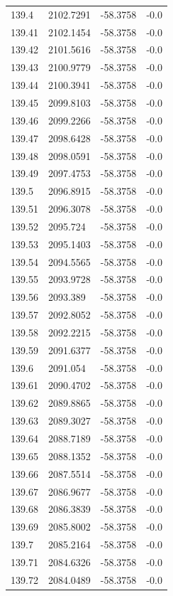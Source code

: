 \begin{table}[H]
\begin{tabular}{llll}
139.4 & 2102.7291 & -58.3758 & -0.0 \\
139.41 & 2102.1454 & -58.3758 & -0.0 \\
139.42 & 2101.5616 & -58.3758 & -0.0 \\
139.43 & 2100.9779 & -58.3758 & -0.0 \\
139.44 & 2100.3941 & -58.3758 & -0.0 \\
139.45 & 2099.8103 & -58.3758 & -0.0 \\
139.46 & 2099.2266 & -58.3758 & -0.0 \\
139.47 & 2098.6428 & -58.3758 & -0.0 \\
139.48 & 2098.0591 & -58.3758 & -0.0 \\
139.49 & 2097.4753 & -58.3758 & -0.0 \\
139.5 & 2096.8915 & -58.3758 & -0.0 \\
139.51 & 2096.3078 & -58.3758 & -0.0 \\
139.52 & 2095.724 & -58.3758 & -0.0 \\
139.53 & 2095.1403 & -58.3758 & -0.0 \\
139.54 & 2094.5565 & -58.3758 & -0.0 \\
139.55 & 2093.9728 & -58.3758 & -0.0 \\
139.56 & 2093.389 & -58.3758 & -0.0 \\
139.57 & 2092.8052 & -58.3758 & -0.0 \\
139.58 & 2092.2215 & -58.3758 & -0.0 \\
139.59 & 2091.6377 & -58.3758 & -0.0 \\
139.6 & 2091.054 & -58.3758 & -0.0 \\
139.61 & 2090.4702 & -58.3758 & -0.0 \\
139.62 & 2089.8865 & -58.3758 & -0.0 \\
139.63 & 2089.3027 & -58.3758 & -0.0 \\
139.64 & 2088.7189 & -58.3758 & -0.0 \\
139.65 & 2088.1352 & -58.3758 & -0.0 \\
139.66 & 2087.5514 & -58.3758 & -0.0 \\
139.67 & 2086.9677 & -58.3758 & -0.0 \\
139.68 & 2086.3839 & -58.3758 & -0.0 \\
139.69 & 2085.8002 & -58.3758 & -0.0 \\
139.7 & 2085.2164 & -58.3758 & -0.0 \\
139.71 & 2084.6326 & -58.3758 & -0.0 \\
139.72 & 2084.0489 & -58.3758 & -0.0 \\

\end{tabular}
\end{table}
